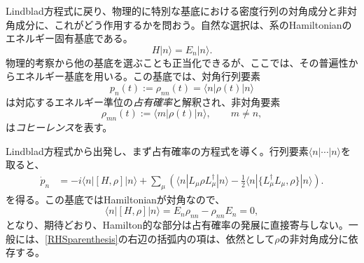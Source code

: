 \documentclass[a4paper,11pt,oneside]{article}
\theoremstyle{definition}
\numberwithin{equation}{section}
\begin{document}
Lindblad方程式に戻り、物理的に特別な基底における密度行列の対角成分と非対角成分に、これがどう作用するかを問おう。自然な選択は、系のHamiltonianのエネルギー固有基底である。
\begin{equation}
H|n\rangle = E_n |n\rangle .
\end{equation}
物理的考察から他の基底を選ぶことも正当化できるが、ここでは、その普遍性からエネルギー基底を用いる。この基底では、対角行列要素
\begin{equation}
p_n(t) := \rho_{nn}(t) = \langle n|\rho(t)|n\rangle
\end{equation}
は対応するエネルギー準位の\textit{占有確率}と解釈され、非対角要素
\begin{equation}
\rho_{mn}(t) := \langle m|\rho(t)|n\rangle ,
\qquad m\neq n ,
\end{equation}
は\textit{コヒーレンス}を表す。



Lindblad方程式から出発し、まず占有確率の方程式を導く。行列要素$\langle n| \cdots |n\rangle$を取ると、
\begin{align}\label{RHSparenthesis}
\dot p_n
&=
-i\langle n|[H,\rho]|n\rangle
+
\sum_\mu
\left(
\langle n|L_\mu \rho L_\mu^\dagger|n\rangle
-\frac12 \langle n|\{L_\mu^\dagger L_\mu,\rho\}|n\rangle
\right) .
\end{align}
を得る。この基底ではHamiltonianが対角なので、
\begin{equation}
\langle n|[H,\rho]|n\rangle = E_n \rho_{nn}-\rho_{nn}E_n = 0 ,
\end{equation}
となり、期待どおり、Hamilton的な部分は占有確率の発展に直接寄与しない。一般には、\eqref{RHSparenthesis}の右辺の括弧内の項は、依然として$\rho$の非対角成分に依存する。
\end{document}
